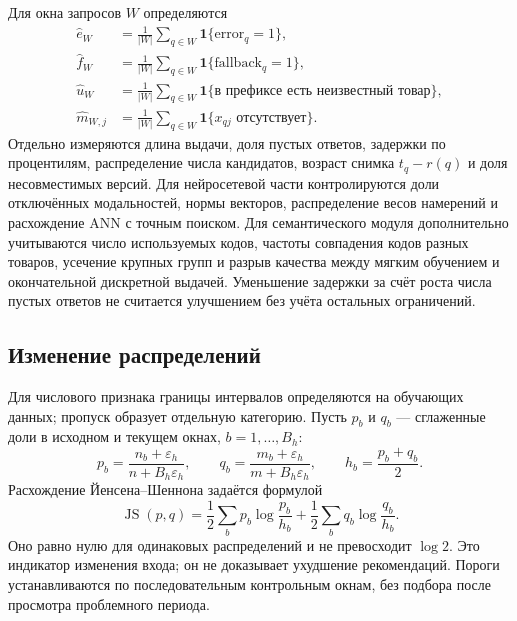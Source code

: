 \documentclass[12pt,a4paper]{article}
\newcommand{\ind}{\mathbf 1}
\newcommand{\eps}{\varepsilon}
\theoremstyle{plainru}
\begin{document}
Для окна запросов \(W\) определяются
\begin{align}
\widehat e_W&=\frac1{|W|}\sum_{q\in W}\ind\{\mathrm{error}_q=1\},\\
\widehat f_W&=\frac1{|W|}\sum_{q\in W}\ind\{\mathrm{fallback}_q=1\},\\
\widehat u_W&=\frac1{|W|}\sum_{q\in W}\ind\{\text{в префиксе есть неизвестный товар}\},\\
\widehat m_{W,j}&=\frac1{|W|}\sum_{q\in W}\ind\{x_{qj}\text{ отсутствует}\}.
\end{align}
Отдельно измеряются длина выдачи, доля пустых ответов,
задержки по процентилям, распределение числа кандидатов,
возраст снимка \(t_q-r(q)\) и доля несовместимых версий.
Для нейросетевой части контролируются доли отключённых модальностей,
нормы векторов, распределение весов намерений и расхождение ANN
с точным поиском. Для семантического модуля дополнительно учитываются
число используемых кодов, частоты совпадения кодов разных товаров,
усечение крупных групп и разрыв качества между мягким обучением
и окончательной дискретной выдачей.
Уменьшение задержки за счёт роста числа пустых ответов
не считается улучшением без учёта остальных ограничений.

\subsection{Изменение распределений}

Для числового признака границы интервалов определяются на обучающих
данных; пропуск образует отдельную категорию. Пусть \(p_b\) и \(q_b\)
--- сглаженные доли в исходном и текущем окнах, \(b=1,\ldots,B_h\):
\begin{equation}\label{eq:ops-hist}
p_b=\frac{n_b+\eps_h}{n+B_h\eps_h},\qquad
q_b=\frac{m_b+\eps_h}{m+B_h\eps_h},\qquad h_b=\frac{p_b+q_b}{2}.
\end{equation}
Расхождение Йенсена--Шеннона задаётся формулой
\begin{equation}\label{eq:ops-js}
\operatorname{JS}(p,q)=\frac12\sum_b p_b\log\frac{p_b}{h_b}
+\frac12\sum_b q_b\log\frac{q_b}{h_b}.
\end{equation}
Оно равно нулю для одинаковых распределений и не превосходит
\(\log2\). Это индикатор изменения входа; он не доказывает
ухудшение рекомендаций. Пороги устанавливаются по последовательным
контрольным окнам, без подбора после просмотра проблемного периода.
\end{document}
